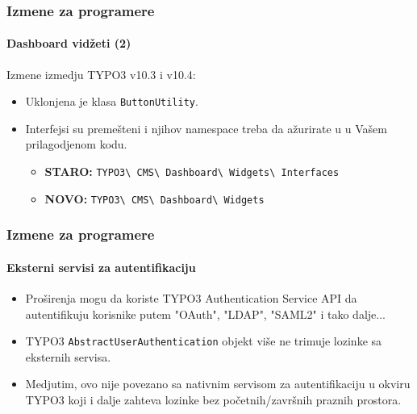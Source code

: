 \begin{frame}[fragile]
	\frametitle{Izmene za programere}
	\framesubtitle{Dashboard vidžeti (2)}

	Izmene izmedju TYPO3 v10.3 i v10.4:

	\begin{itemize}
		\item Uklonjena je klasa \texttt{ButtonUtility}.
		\item Interfejsi su premešteni i njihov namespace treba da ažurirate u
			u Vašem prilagodjenom kodu.
			\begin{itemize}\smaller
				\item \textbf{STARO:}
					\texttt{TYPO3\textbackslash
						CMS\textbackslash
						Dashboard\textbackslash
						Widgets\textbackslash
						Interfaces}
				\item \textbf{NOVO:}
					\texttt{TYPO3\textbackslash
						CMS\textbackslash
						Dashboard\textbackslash
						Widgets}
			\end{itemize}\normalsize
	\end{itemize}

\end{frame}


\begin{frame}[fragile]
	\frametitle{Izmene za programere}
	\framesubtitle{Eksterni servisi za autentifikaciju}

	\begin{itemize}

		\item Proširenja mogu da koriste TYPO3 Authentication Service API
			da autentifikuju korisnike putem "OAuth", "LDAP", "SAML2" i tako dalje...
		\item TYPO3 \texttt{AbstractUserAuthentication} objekt više ne trimuje lozinke sa eksternih servisa.
		\item Medjutim, ovo nije povezano sa nativnim servisom za autentifikaciju u okviru TYPO3
			koji i dalje zahteva lozinke bez početnih/završnih praznih prostora.

	\end{itemize}

\end{frame}


